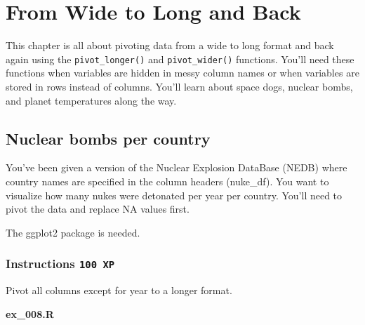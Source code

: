 \documentclass[
  letterpaper,
  DIV=11,
  numbers=noendperiod]{scrreprt}
\begin{document}

\hypertarget{from-wide-to-long-and-back}{%
\chapter{From Wide to Long and Back}\label{from-wide-to-long-and-back}}

This chapter is all about pivoting data from a wide to long format and
back again using the \texttt{pivot\_longer()} and
\texttt{pivot\_wider()} functions. You'll need these functions when
variables are hidden in messy column names or when variables are stored
in rows instead of columns. You'll learn about space dogs, nuclear
bombs, and planet temperatures along the way.

\hypertarget{nuclear-bombs-per-country}{%
\section{Nuclear bombs per country}\label{nuclear-bombs-per-country}}

You've been given a version of the Nuclear Explosion DataBase (NEDB)
where country names are specified in the column headers (nuke\_df). You
want to visualize how many nukes were detonated per year per country.
You'll need to pivot the data and replace NA values first.

The ggplot2 package is needed.

\hypertarget{instructions-100-xp-7}{%
\subsection*{\texorpdfstring{Instructions
\texttt{100\ XP}}{Instructions 100 XP}}\label{instructions-100-xp-7}}

Pivot all columns except for year to a longer format.

\textbf{ex\_008.R}
\end{document}
